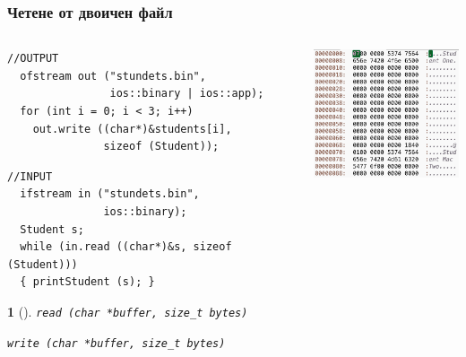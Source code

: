 \documentclass{beamer}
\newtheorem*{remark}{}
\begin{document}
\begin{frame}[fragile]
\frametitle{Четене от двоичен файл}



\begin{columns}[t]
  \begin{column}{0.6\textwidth}
      \begin{flushleft}
      \begin{lstlisting}
//OUTPUT
  ofstream out ("stundets.bin",
                ios::binary | ios::app);
  for (int i = 0; i < 3; i++)
    out.write ((char*)&students[i],
               sizeof (Student));
\end{lstlisting}
\begin{lstlisting}  
//INPUT
  ifstream in ("stundets.bin",
               ios::binary);
  Student s;
  while (in.read ((char*)&s, sizeof (Student)))
  { printStudent (s); }
      \end{lstlisting}
\begin{remark}[]
    \texttt{read (char *buffer, size\_t bytes)}

    \texttt{write (char *buffer, size\_t bytes)}
\end{remark}      
      \end{flushleft} 
  \end{column}
  \begin{column}{0.4\textwidth}

  \includegraphics[width=4.5cm]{images/binfiless}
  \end{column}
\end{columns}
\end{frame}
\end{document}
